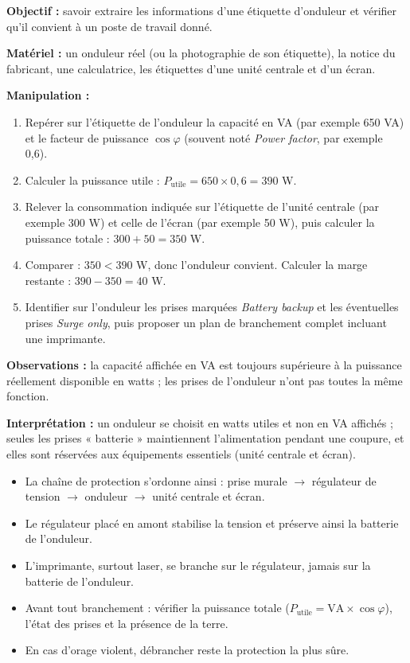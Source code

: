 \documentclass[11pt]{article}
\begin{document}
\begin{experience}
\textbf{Objectif :} savoir extraire les informations d'une étiquette d'onduleur et vérifier qu'il convient à un poste de travail donné.

\textbf{Matériel :} un onduleur réel (ou la photographie de son étiquette), la notice du fabricant, une calculatrice, les étiquettes d'une unité centrale et d'un écran.

\textbf{Manipulation :}
\begin{enumerate}
    \item Repérer sur l'étiquette de l'onduleur la capacité en VA (par exemple 650 VA) et le facteur de puissance $\cos\varphi$ (souvent noté \emph{Power factor}, par exemple 0,6).
    \item Calculer la puissance utile : $P_{\text{utile}} = 650 \times 0{,}6 = 390$ W.
    \item Relever la consommation indiquée sur l'étiquette de l'unité centrale (par exemple 300 W) et celle de l'écran (par exemple 50 W), puis calculer la puissance totale : $300 + 50 = 350$ W.
    \item Comparer : $350 < 390$ W, donc l'onduleur convient. Calculer la marge restante : $390 - 350 = 40$ W.
    \item Identifier sur l'onduleur les prises marquées \emph{Battery backup} et les éventuelles prises \emph{Surge only}, puis proposer un plan de branchement complet incluant une imprimante.
\end{enumerate}

\textbf{Observations :} la capacité affichée en VA est toujours supérieure à la puissance réellement disponible en watts ; les prises de l'onduleur n'ont pas toutes la même fonction.

\textbf{Interprétation :} un onduleur se choisit en watts utiles et non en VA affichés ; seules les prises « batterie » maintiennent l'alimentation pendant une coupure, et elles sont réservées aux équipements essentiels (unité centrale et écran).
\end{experience}

\begin{aretenir}
\begin{itemize}
    \item La chaîne de protection s'ordonne ainsi : prise murale $\rightarrow$ régulateur de tension $\rightarrow$ onduleur $\rightarrow$ unité centrale et écran.
    \item Le régulateur placé en amont stabilise la tension et préserve ainsi la batterie de l'onduleur.
    \item L'imprimante, surtout laser, se branche sur le régulateur, jamais sur la batterie de l'onduleur.
    \item Avant tout branchement : vérifier la puissance totale ($P_{\text{utile}} = \text{VA} \times \cos\varphi$), l'état des prises et la présence de la terre.
    \item En cas d'orage violent, débrancher reste la protection la plus sûre.
\end{itemize}
\end{aretenir}
\end{document}
